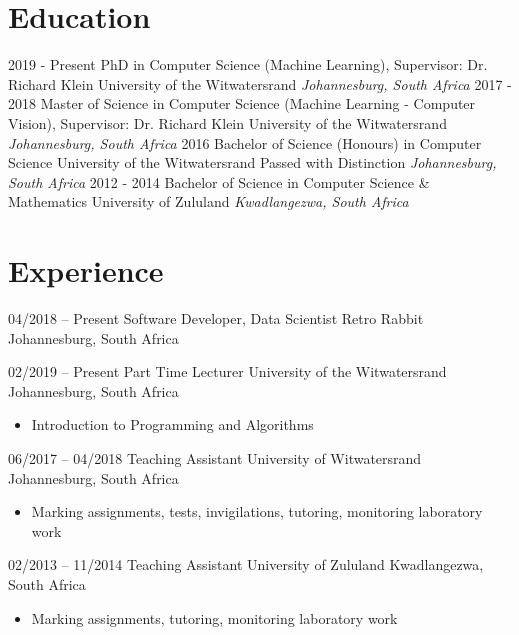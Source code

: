 \documentclass[letterpaper]{moderncv}        %
\begin{document}
\makecvtitle

%

\section{Education}
\cventry
{2019 - Present}
{PhD in Computer Science (Machine Learning), Supervisor: Dr. Richard Klein}
{University of the Witwatersrand}
{}
{\textit{Johannesburg, South Africa}}
{}
\cventry
{2017 - 2018}
{Master of Science in Computer Science (Machine Learning - Computer Vision), Supervisor: Dr. Richard Klein}
{University of the Witwatersrand}
{}
{\textit{Johannesburg, South Africa}}
{}
\cventry
{2016}
{Bachelor of Science (Honours) in Computer Science}
{University of the Witwatersrand}
{Passed with Distinction}
{\textit{Johannesburg, South Africa}}
{}
\cventry
{2012 - 2014}
{Bachelor of Science in Computer Science \& Mathematics}
{University of Zululand}
{}
{\textit{Kwadlangezwa, South Africa}}
{}
\section{Experience}

\cventry
{04/2018 -- Present}
{Software Developer, Data Scientist}
{Retro Rabbit}
{Johannesburg, South Africa}
{}
{}

\cventry
{02/2019 -- Present}
{Part Time Lecturer}
{University of the Witwatersrand}
{Johannesburg, South Africa}
{}
{\begin{itemize}%
		\item Introduction to Programming and Algorithms 
	\end{itemize}}

\cventry
{06/2017 -- 04/2018}
{Teaching Assistant}
{University of Witwatersrand}
{Johannesburg, South Africa}
{}
{\begin{itemize}%
	\item Marking assignments, tests, invigilations, tutoring, monitoring laboratory work
	\end{itemize}}
\cventry
{02/2013 -- 11/2014}
{Teaching Assistant}
{University of Zululand}
{Kwadlangezwa, South Africa}
{}
{\begin{itemize}%
	\item Marking assignments, tutoring, monitoring laboratory work
	\end{itemize}}
\end{document}
